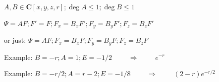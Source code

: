 \documentclass{article}
\def\coeff{\framebox(10,10){}}
\newcommand{\tikzmark}[1]{\tikz[overlay,remember picture] \node (#1) {};}
\begin{document}
$A,B \in \mathbf{C}[x,y,z,r]; \deg A \le 1; \deg B \le 1$

$\Psi = A F; F' = F; F_x = B_x F'; F_y = B_y F'; F_z = B_z F'$

or just: $\Psi = A F; F_x = B_x F; F_y = B_y F; F_z = B_z F$

Example: $B=-r; A=1; E=-1/2$ $\qquad\Rightarrow\qquad$ $e^{-r}$

Example: $B=-r/2; A=r-2; E=-1/8$ $\qquad\Rightarrow\qquad$ $(2-r)e^{-r/2}$

\end{document}
